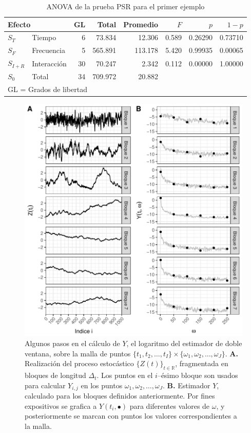 \documentclass[12pt,letterpaper]{book}
\newcommand{\R}{\mathbb{R}}
\begin{document}
\begin{table}
\centering
\caption{ANOVA de la prueba PSR para el primer ejemplo}
\begin{tabular}{llrrrrrr}
\toprule
\multicolumn{2}{l}{Efecto}
                        & GL & Total   & Promedio & $F$   & $p$     & $1-p$   \\
\midrule
$S_T$     & Tiempo      & 6  & 73.834  & 12.306   & 0.589 & 0.26290 & 0.73710 \\
$S_F$     & Frecuencia  & 5  & 565.891 & 113.178  & 5.420 & 0.99935 & 0.00065 \\
$S_{I+R}$ & Interacción & 30 & 70.247  & 2.342    & 0.112 & 0.00000 & 1.00000 \\
$S_0$     & Total       & 34 & 709.972 & 20.882   &       &         &         \\
\bottomrule
\multicolumn{5}{l}{GL = Grados de libertad}
\end{tabular}
\label{tab:ejemplo_gl}
\end{table}

\begin{figure}
\centering
\includegraphics[width=\linewidth]{./scripts_graf_res/proceso_Z_fragmentado_doble.pdf}
\caption{Algunos pasos en el cálculo de $Y$, el logaritmo del estimador de doble ventana, sobre la malla de puntos $\{ t_1, t_2, \dots, t_I\} \times \{\omega_1, \omega_2, \dots, \omega_J\}$.
\textbf{A.}
Realización del proceso estocástico $\{Z(t)\}_{t\in\R}$, fragmentada en bloques de longitud $\Delta_t$. 
%
Los puntos en el $i$--ésimo bloque son usados para calcular $Y_{i,j}$ en los puntos $\omega_1, \omega_2, \dots, \omega_J$.
\textbf{B.}
Estimador $Y$, calculado para los bloques definidos anteriormente.
%
Por fines expositivos se grafica a $Y(t_i,\bullet)$ para diferentes valores de $\omega$, y posteriormente se marcan con puntos los valores correspondientes a la malla.}
\label{fig:proceso_psr}
\end{figure}
\end{document}
